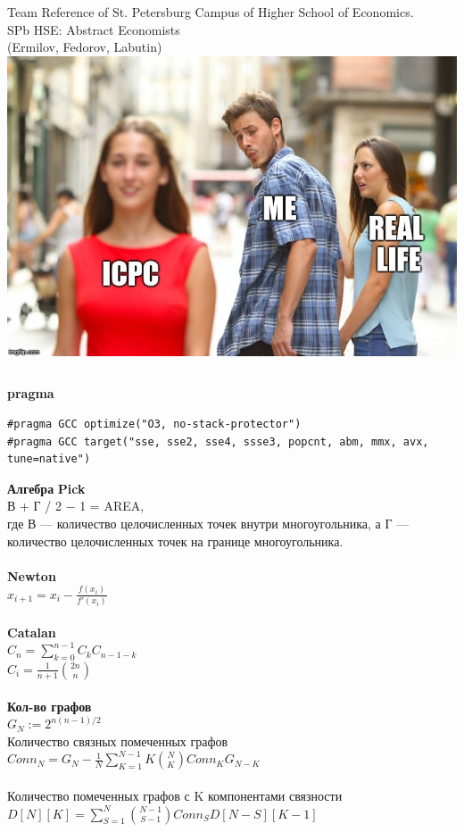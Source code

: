 \documentclass[a4paper,10pt, twocolumn]{article}
\begin{document}
\onecolumn
{}
\vspace*{\fill}
\begin{center}{ \Large Team Reference of St. Petersburg Campus of Higher School of Economics.\\ SPb HSE: Abstract Economists\\ (Ermilov, Fedorov, Labutin)\\
		\vspace{0.5cm} \includegraphics[width=0.8\linewidth]{meme.jpg}} 
\end{center}
\vspace*{\fill}
\pagebreak \twocolumn
\inputminted[linenos, breaklines]{c++}{code/pollard.cpp}
\pagebreak
\textbf{pragma}
\begin{verbatim}
#pragma GCC optimize("O3, no-stack-protector")
#pragma GCC target("sse, sse2, sse4, ssse3, popcnt, abm, mmx, avx, tune=native")
\end{verbatim}

\textbf{Алгебра} 
{\bf Pick}\\
В + Г / 2 − 1 = AREA,\\
где В — количество целочисленных точек внутри многоугольника, а Г — количество целочисленных точек на границе многоугольника.\\\\

{\bf Newton}\\
$x_{i+1}=x_i-\frac {f(x_i)} {f'(x_i)}$\\\\

{\bf Catalan}\\
$C_n=\sum\limits_{k=0}^{n-1} C_{k} C_{n-1-k}$\\
$C_i=\frac 1 {n + 1} \binom {2n} {n}$\\\\

{\bf Кол-во графов}\\
$G_N:=2^{n(n-1)/2}$\\
Количество связных помеченных графов\\
$Conn_N = G_N - \frac 1 N \sum\limits_{K=1}^{N-1} K \binom N K Conn_K G_{N-K}$\\\\
Количество помеченных графов с K компонентами связности\\
$D[N][K]=\sum\limits_{S=1}^N \binom {N-1} {S-1} Conn_S D[N-S][K-1]$\\\\
\end{document}
